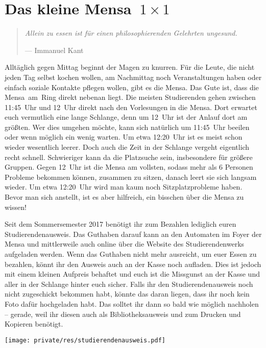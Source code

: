 \section[Das kleine Mensa~1~×~1]{\boldmath Das kleine Mensa~${1 \times 1}$}
\begin{multicols}{2}
\begin{quote}
	\textit{Allein zu essen ist für einen philosophierenden Gelehrten ungesund.}
	
	\hfill--- Immanuel Kant
\end{quote}

Alltäglich gegen Mittag beginnt der Magen zu knurren.
Für die Leute, die nicht jeden Tag selbst kochen wollen, am Nachmittag noch Veranstaltungen haben oder einfach soziale Kontakte pflegen wollen, gibt es die Mensa.
Das Gute ist, dass die Mensa~am~Ring direkt nebenan liegt.
Die meisten Studierenden gehen zwischen 11:45~Uhr und 12~Uhr direkt nach den Vorlesungen in die Mensa.
Dort erwartet euch vermutlich eine lange Schlange, denn um 12~Uhr ist der Anlauf dort am größten. Wer dies umgehen möchte, kann sich natürlich um 11:45~Uhr beeilen oder wenn möglich ein wenig warten. Um etwa 12:20~Uhr ist es meist schon wieder wesentlich leerer.
Doch auch die Zeit in der Schlange vergeht eigentlich recht schnell. Schwieriger kann da die Platzsuche sein, insbesondere für größere Gruppen. Gegen 12~Uhr ist die Mensa am vollsten, sodass mehr als 6 Personen Probleme bekommen können, zusammen zu sitzen, danach leert sie sich langsam wieder. Um etwa 12:20~Uhr wird man kaum noch Sitzplatzprobleme haben.
Bevor man sich anstellt, ist es aber hilfreich, ein bisschen über die Mensa zu wissen!

Seit dem Sommersemester 2017 benötigt ihr zum Bezahlen lediglich euren Studierendenausweis.
Das Guthaben darauf kann an den Automaten im Foyer der Mensa und mittlerweile auch online über die Website des Studierendenwerks aufgeladen werden.
Wenn das Guthaben nicht mehr ausreicht, um euer Essen zu bezahlen, könnt ihr den Ausweis auch an der Kasse noch aufladen. 
Dies ist jedoch mit einem kleinen Aufpreis behaftet und euch ist die Missgunst an der Kasse und aller in der Schlange hinter euch sicher.
Falls ihr den Studierendenausweis noch nicht zugeschickt bekommen habt, könnte das daran liegen, dass ihr noch kein Foto dafür hochgeladen habt.
Das solltet ihr dann so bald wie möglich nachholen -- gerade, weil ihr diesen auch als Bibliotheksausweis und zum Drucken und Kopieren benötigt.

 \begin{center}
 	\texttt{[image: private/res/studierendenausweis.pdf]}
 \end{center}


\end{multicols}
